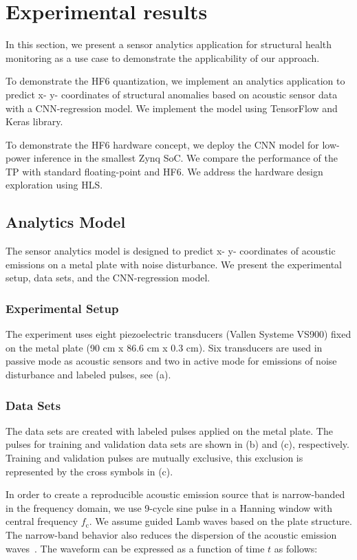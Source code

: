 \section{Experimental results}
\label{sec:experimental_results}
In this section, we present a sensor analytics application for structural health monitoring as a use case to demonstrate the applicability of our approach. 

To demonstrate the HF6 quantization, we implement an analytics application to predict x- y- coordinates of structural anomalies based on acoustic sensor data with a CNN-regression model. We implement the model using TensorFlow and Keras library.

To demonstrate the HF6 hardware concept, we deploy the CNN model for low-power inference in the smallest Zynq SoC. We compare the performance of the TP with standard floating-point and HF6. We address the hardware design exploration using HLS.

\subsection{Analytics Model}
The sensor analytics model is designed to predict x- y- coordinates of acoustic emissions on a metal plate with noise disturbance. We present the experimental setup, data sets, and the CNN-regression model.

\subsubsection{Experimental Setup}
The experiment uses eight piezoelectric transducers (Vallen Systeme VS900) fixed on the metal plate (90 cm x 86.6 cm x 0.3 cm). Six transducers are used in passive mode as acoustic sensors and two in active mode for emissions of noise disturbance and labeled pulses, see (a).

\subsubsection{Data Sets}
The data sets are created with labeled pulses applied on the metal plate. The pulses for training and validation data sets are shown in (b) and (c), respectively. Training and validation pulses are mutually exclusive, this exclusion is represented by the cross symbols in (c).

In order to create a reproducible acoustic emission source that is narrow-banded in the frequency domain, we use 9-cycle sine pulse in a Hanning window with central frequency $f_\mathrm{c}$. We assume guided Lamb waves based on the plate structure. The narrow-band behavior also reduces the dispersion of the acoustic emission waves~\cite{hannwindowsine}. The waveform can be expressed as a function of time $t$ as follows:

